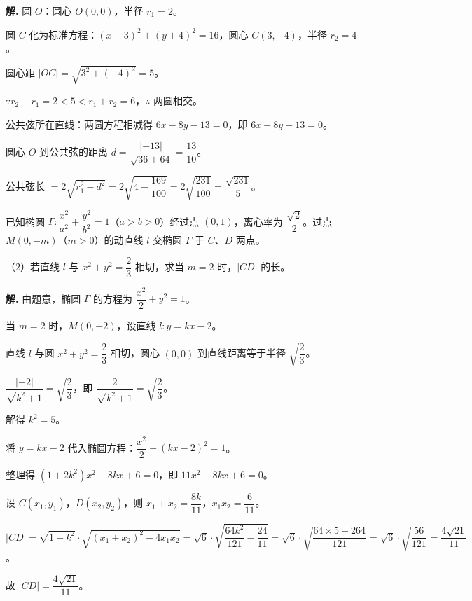 \documentclass[11pt]{ctexrep}
\begin{document}
\textbf{解.} 圆 $O$：圆心 $O(0, 0)$，半径 $r_1 = 2$。

圆 $C$ 化为标准方程：$(x - 3)^2 + (y + 4)^2 = 16$，圆心 $C(3, -4)$，半径 $r_2 = 4$。

圆心距 $|OC| = \sqrt{3^2 + (-4)^2} = 5$。

$\because r_2 - r_1 = 2 < 5 < r_1 + r_2 = 6$，$\therefore$ 两圆相交。

公共弦所在直线：两圆方程相减得 $6x - 8y - 13 = 0$，即 $\boxed{6x - 8y - 13 = 0}$。

圆心 $O$ 到公共弦的距离 $d = \dfrac{| -13|}{\sqrt{36 + 64}} = \dfrac{13}{10}$。

公共弦长 $= 2\sqrt{r_1^2 - d^2} = 2\sqrt{4 - \dfrac{169}{100}} = 2\sqrt{\dfrac{231}{100}} = \boxed{\dfrac{\sqrt{231}}{5}}$。

\begin{realexam}[2026 奉贤二模]
    已知椭圆 $\Gamma: \dfrac{x^2}{a^2} + \dfrac{y^2}{b^2} = 1$（$a > b > 0$）经过点 $(0, 1)$，离心率为 $\dfrac{\sqrt{2}}{2}$。过点 $M(0, -m)$（$m > 0$）的动直线 $l$ 交椭圆 $\Gamma$ 于 $C$、$D$ 两点。
    
    （2）若直线 $l$ 与 $x^2 + y^2 = \dfrac{2}{3}$ 相切，求当 $m = 2$ 时，$|CD|$ 的长。
\end{realexam}

\textbf{解.} 由题意，椭圆 $\Gamma$ 的方程为 $\dfrac{x^2}{2} + y^2 = 1$。

当 $m = 2$ 时，$M(0, -2)$，设直线 $l: y = kx - 2$。

直线 $l$ 与圆 $x^2 + y^2 = \dfrac{2}{3}$ 相切，圆心 $(0, 0)$ 到直线距离等于半径 $\sqrt{\dfrac{2}{3}}$。

$\dfrac{| -2|}{\sqrt{k^2 + 1}} = \sqrt{\dfrac{2}{3}}$，即 $\dfrac{2}{\sqrt{k^2 + 1}} = \sqrt{\dfrac{2}{3}}$。

解得 $k^2 = 5$。

将 $y = kx - 2$ 代入椭圆方程：$\dfrac{x^2}{2} + (kx - 2)^2 = 1$。

整理得 $(1 + 2k^2)x^2 - 8kx + 6 = 0$，即 $11x^2 - 8kx + 6 = 0$。

设 $C(x_1, y_1)$，$D(x_2, y_2)$，则 $x_1 + x_2 = \dfrac{8k}{11}$，$x_1x_2 = \dfrac{6}{11}$。

$|CD| = \sqrt{1 + k^2} \cdot \sqrt{(x_1 + x_2)^2 - 4x_1x_2} = \sqrt{6} \cdot \sqrt{\dfrac{64k^2}{121} - \dfrac{24}{11}} = \sqrt{6} \cdot \sqrt{\dfrac{64 \times 5 - 264}{121}} = \sqrt{6} \cdot \sqrt{\dfrac{56}{121}} = \dfrac{4\sqrt{21}}{11}$。

故 $|CD| = \boxed{\dfrac{4\sqrt{21}}{11}}$。
\end{document}
